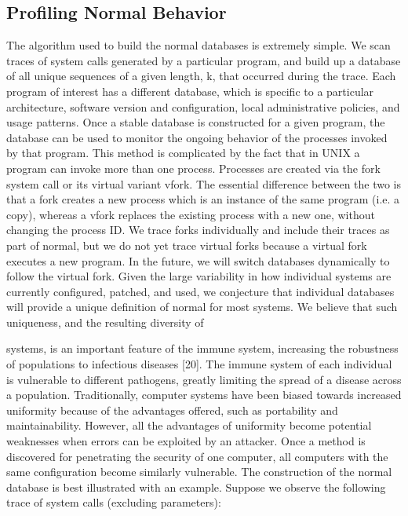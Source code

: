 \documentclass{report}
\begin{document}
\begin{spacing}{1.5}
\subsection{Profiling Normal Behavior}

The algorithm used to build the normal databases is extremely simple. We scan traces of
system calls generated by a particular program, and build up a database of all unique
sequences of a given length, k, that occurred during the trace. Each program of interest
has a different database, which is specific to a particular architecture, software version
and configuration, local administrative policies, and usage patterns. Once a stable
database is constructed for a given program, the database can be used to monitor the
ongoing behavior of the processes invoked by that program.
This method is complicated by the fact that in UNIX a program can invoke more than one
process. Processes are created via the fork system call or its virtual variant vfork. The
essential difference between the two is that a fork creates a new process which is an
instance of the same program (i.e. a copy), whereas a vfork replaces the existing
process with a new one, without changing the process ID. We trace forks individually and
include their traces as part of normal, but we do not yet trace virtual forks because a
virtual fork executes a new program. In the future, we will switch databases dynamically
to follow the virtual fork.
Given the large variability in how individual systems are currently configured, patched,
and used, we conjecture that individual databases will provide a unique definition of
normal for most systems. We believe that such uniqueness, and the resulting diversity of


systems, is an important feature of the immune system, increasing the robustness of
populations to infectious diseases [20]. The immune system of each individual is
vulnerable to different pathogens, greatly limiting the spread of a disease across a
population. Traditionally, computer systems have been biased towards increased
uniformity because of the advantages offered, such as portability and maintainability.
However, all the advantages of uniformity become potential weaknesses when errors can
be exploited by an attacker. Once a method is discovered for penetrating the security of
one computer, all computers with the same configuration become similarly vulnerable.
The construction of the normal database is best illustrated with an example. Suppose we
observe the following trace of system calls (excluding parameters):



\end{spacing}
\end{document}
